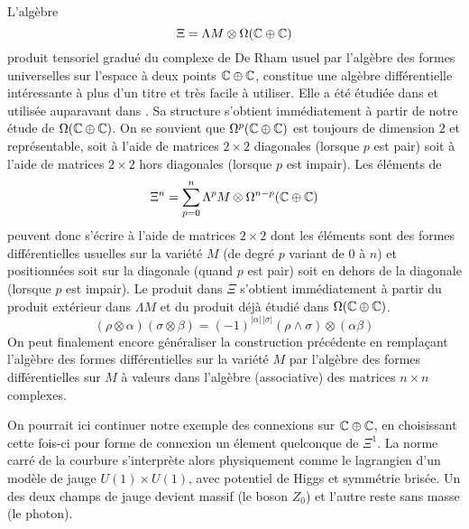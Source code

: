 L'alg\`ebre $$\Xi  =  \Lambda M \otimes \Omega (\mathbb{C} \oplus \mathbb{C})$$
produit tensoriel gradu\'e du complexe de De Rham usuel par l'alg\`ebre 
des formes universelles sur l'espace \`a deux points $\mathbb{C} \oplus \mathbb{C}$, 
constitue une alg\`ebre diff\'erentielle int\'eressante \`a plus d'un titre et tr\`es 
facile \`a utiliser. Elle a \'et\'e \'etudi\'ee dans \cite{CHS} et utilis\'ee auparavant dans \cite{CEV}.
Sa structure s'obtient imm\'ediatement \`a partir de notre \'etude de 
$\Omega (\mathbb{C} \oplus \mathbb{C})$. On se souvient que 
$\Omega^p (\mathbb{C} \oplus \mathbb{C})$ est toujours de dimension $2$ et 
repr\'esentable, soit \`a l'aide de matrices $2\times 2$ diagonales 
(lorsque $p$ est pair) soit \`a l'aide de matrices $2\times 2$ hors 
diagonales (lorsque $p$ est impair). Les \'el\'ements de 
$$\Xi^n = \sum_{p=0}^n \Lambda^p M \otimes \Omega^{n-p}(\mathbb{C} \oplus \mathbb{C})$$
peuvent donc s'\'ecrire \`a l'aide de matrices $2 \times 2$ dont les 
\'el\'ements sont des formes diff\'erentielles usuelles sur la vari\'et\'e $M$ (de degr\'e $p$ 
variant de $0$ \`a $n$) et positionn\'ees soit sur la diagonale (quand 
$p$ est pair) soit en dehors de la diagonale (lorsque $p$ est impair). 
Le produit dans $\Xi$ s'obtient imm\'ediatement \`a partir du produit 
ext\'erieur dans $\Lambda M$ et du produit d\'ej\`a \'etudi\'e dans $\Omega 
(\mathbb{C} \oplus \mathbb{C})$.
$$ (\rho \otimes \alpha)(\sigma \otimes \beta)  = 
(-1)^{\vert \alpha \vert \, \vert \sigma \vert}(\rho \land \sigma)\otimes 
(\alpha \beta) $$
On peut finalement encore g\'en\'eraliser la construction pr\'ec\'edente en 
rempla\c cant l'alg\`ebre des 
formes diff\'erentielles sur la vari\'et\'e $M$ par l'alg\`ebre des 
formes diff\'erentielles sur $M$ \`a valeurs dans l'alg\`ebre (associative) 
des matrices $n \times n$ complexes.

On pourrait ici continuer notre exemple des connexions sur $\mathbb{C} 
\oplus \mathbb{C}$, en choisissant cette fois-ci pour forme de connexion un 
\'element quelconque de $\Xi^{1}$. La norme carr\'e de la courbure 
s'interpr\`ete alors physiquement comme le lagrangien d'un mod\`ele de 
jauge $U(1) \times U(1)$, avec potentiel de Higgs  et symm\'etrie 
bris\'ee. Un des deux champs de jauge devient massif (le boson 
$Z_{0}$) et l'autre reste sans masse (le photon).

